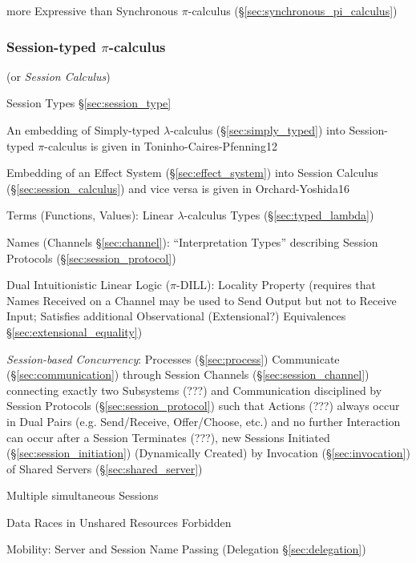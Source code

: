 more Expressive than Synchronous $\pi$-calculus
(\S\ref{sec:synchronous_pi_calculus})



\subsubsection{Session-typed $\pi$-calculus}
\label{sec:sessiontyped_pi}
\cite{honda-vasconcelos-kubo98}
\cite{caires-pfenning10}
\cite{caires-pfenning-toninho12}

(or \emph{Session Calculus})

Session Types \S\ref{sec:session_type}

\fist An embedding of Simply-typed $\lambda$-calculus
(\S\ref{sec:simply_typed}) into Session-typed $\pi$-calculus is given
in Toninho-Caires-Pfenning12 \cite{caires-pfenning-toninho12}

\fist Embedding of an Effect System (\S\ref{sec:effect_system}) into
Session Calculus (\S\ref{sec:session_calculus}) and vice versa is
given in Orchard-Yoshida16 \cite{orchard-yoshida16}

Terms (Functions, Values): Linear $\lambda$-calculus Types
(\S\ref{sec:typed_lambda})

Names (Channels \S\ref{sec:channel}): ``Interpretation Types''
describing Session Protocols (\S\ref{sec:session_protocol})

Dual Intuitionistic Linear Logic ($\pi$-DILL):
\cite{caires-pfenning10} Locality Property (requires that Names
Received on a Channel may be used to Send Output but not to Receive
Input; Satisfies additional Observational (Extensional?) Equivalences
\S\ref{sec:extensional_equality}) \cite{wadler12}

\emph{Session-based Concurrency}: Processes (\S\ref{sec:process})
Communicate (\S\ref{sec:communication}) through Session Channels
(\S\ref{sec:session_channel}) connecting exactly two Subsystems (???)
and Communication disciplined by Session Protocols
(\S\ref{sec:session_protocol}) such that Actions (???) always occur in
Dual Pairs (e.g. Send/Receive, Offer/Choose, etc.) and no further
Interaction can occur after a Session Terminates (???), new Sessions
Initiated (\S\ref{sec:session_initiation}) (Dynamically Created) by
Invocation (\S\ref{sec:invocation}) of Shared Servers
(\S\ref{sec:shared_server}) \cite{caires-pfenning10}

Multiple simultaneous Sessions

Data Races in Unshared Resources Forbidden

Mobility: Server and Session Name Passing (Delegation
\S\ref{sec:delegation})

